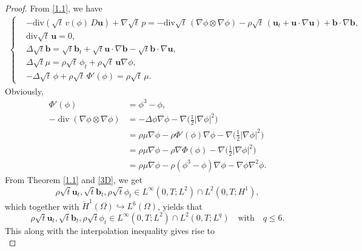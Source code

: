 \documentclass[10pt,a4paper]{amsart}
\begin{document}
\begin{proof}
From \eqref{1.1}, we have
\begin{align}
\begin{cases}
&-\mathrm{div}\left( \sqrt{t}\, v(\phi)\, D\mathbf{u} \right) + \nabla \sqrt{t}\, p = -\mathrm{div}\sqrt{t}\, (\nabla \phi \otimes \nabla \phi) - \rho \sqrt{t}\, (\mathbf{u}_t + \mathbf{u} \cdot \nabla \mathbf{u})+  \mathbf{b} \cdot \nabla \mathbf{b}
,\label{eq-n} \\
&\mathrm{div}\sqrt{t}\, \mathbf{u} = 0,\\
&\Delta\sqrt{t}\mathbf{b}=\sqrt{t}\mathbf{b}_t + \sqrt{t}\mathbf{u} \cdot \nabla \mathbf{b}-\sqrt{t}\mathbf{b} \cdot \nabla \mathbf{u},\\
&\Delta \sqrt{t}\mu = \rho \sqrt{t}\, \phi_t + \rho \sqrt{t}\, \mathbf{u} \nabla \phi, \\
&-\Delta \sqrt{t}\, \phi + \rho \sqrt{t}\, \Phi'(\phi) = \rho \sqrt{t}\, \mu.
\end{cases}
\end{align}
Obviously,
\begin{equation*}
\begin{split}
\Phi'(\phi)&=\phi^3-\phi,\\
-\operatorname{div}(\nabla \phi \otimes \nabla \phi) &= -\Delta \phi \nabla \phi - \nabla \Big( \frac{1}{2} |\nabla \phi|^2 \Big) \\
&= \rho \mu \nabla \phi - \rho \Phi'(\phi) \nabla \phi - \nabla \Big( \frac{1}{2} |\nabla \phi|^2 \Big) \\
&= \rho \mu \nabla \phi - \rho \nabla \Phi(\phi) - \nabla \Big( \frac{1}{2} |\nabla \phi|^2 \Big)\\
&= \rho \mu \nabla \phi - \rho (\phi^3-\phi)\nabla\phi - \nabla\phi \nabla^2\phi.
\end{split}
\end{equation*}
From Theorem \ref{1.1} and \eqref{3D}, we get
\begin{equation*}
\rho\sqrt{t}\mathbf{u}_t, \sqrt{t}\mathbf{b}_t, \rho\sqrt{t}\phi_t \in L^\infty(0,T;L^2) \cap L^2(0,T;H^1),
\end{equation*}
which together with $\dot{H}^1(\Omega) \hookrightarrow L^6(\Omega)$, yields that
\begin{equation*}
\rho\sqrt{t}\mathbf{u}_t, \sqrt{t}\mathbf{b}_t, \rho\sqrt{t}\phi_t \in L^\infty(0,T;L^2) \cap L^2(0,T;L^q) \quad \text{with} \quad q \leq 6.
\end{equation*}
This along with the interpolation inequality  gives rise to
\begin{equation*}

\end{equation*}
\end{proof}
\end{document}
